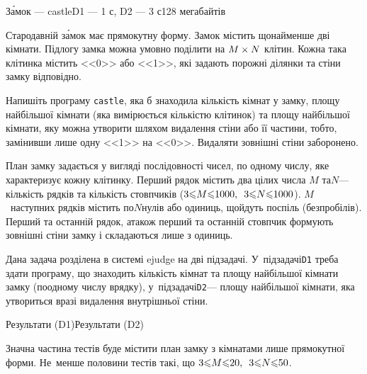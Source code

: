 \begin{problem}{З\'{а}мок --- castle}{\stdinOrInputTxt}{\stdoutOrOutputTxt}{D1 --- 1 с, D2 --- 3 с}{128 мегабайтів}


Стародавній з\'{а}мок має прямокутну форму. Замок містить щонайменше дві кімнати. Підлогу замка можна умовно поділити на $M\times N$ клітин. Кожна така клітинка містить <<0>> або <<1>>, які задають порожні ділянки та стіни замку відповідно.

\Task Напишіть програму \texttt{castle}, яка б знаходила кількість кімнат у зам\-ку, площу найбільшої кімнати (яка вимірюється кількістю клітинок) та площу найбільшої кімнати, яку можна утворити шляхом видалення стіни або її частини, тобто, замінивши лише одну <<1>> на <<0>>. Видаляти зовнішні стіни заборонено.

\InputFile План замку задається у вигляді послідовності чисел, по одному числу, яке характеризує кожну клітинку. Перший рядок містить два цілих числа $M$ та\nolinebreak[2] $N$\nolinebreak[3] --- кількість рядків та кількість стовпчиків (${3{\<}M{\<}1000},\hspace{0.5em plus 1em}{3{\<}N{\<}1000}$). $M$~наступних рядків містить по\nolinebreak[3] $N$\nolinebreak[3] нулів або одиниць, що\nolinebreak[3] йдуть поспіль (без\nolinebreak[2] пробілів). Перший та останній рядок, а\nolinebreak[3] також перший та останній стовпчик формують зовнішні стіни замку і складаються лише з одиниць.

\OutputFile Дана задача розділена в системі ejudge на дві підзадачі. У~підзадачі\nolinebreak[3] \texttt{D1} треба здати програму, що знаходить кількість кімнат та площу найбільшої кімнати замку (по\nolinebreak[3] одному числу в\nolinebreak[3] рядку), у~підзадачі\nolinebreak[2] \texttt{D2}\nolinebreak[3] --- площу найбільшої кімнати, яка утвориться в\nolinebreak[3] разі видалення внутрішньої стіни.

\Examples\vspace*{-\baselineskip}

\begin{exampleSimpleThreeWithSpecNameColTwo}{7em}{3em}{3em}{Результати (D1)}{Результати (D2)}%
%
%
\end{exampleSimpleThreeWithSpecNameColTwo}

\Scoring Значна частина тестів буде містити план замку з кімнатами лише прямокутної форми. Не~менше половини тестів такі, що ${3{\<}M{\<}20},\hspace{0.5em plus 1em}{3{\<}N{\<}50}$.

\end{problem}
